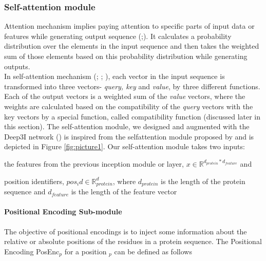 \documentclass[8pt]{article}
\begin{document}
\begin{multicols}{2}
\subsubsection{Self-attention module}
Attention mechanism implies paying attention to specific parts of input data or features while generating output sequence (\cite{bahdanau2014neural};\cite{vaswani2017attention}). It calculates a probability distribution over the elements in the input sequence and then takes the
weighted sum of those elements based on this probability distribution while generating outputs. \\

In self-attention mechanism (\cite{cheng2016long}; \cite{parikh2016decomposable}; \cite{vaswani2017attention}), each vector in the input sequence is
transformed into three vectors- \textit{query, key} and \textit{value}, by three different functions. Each of the output vectors is a weighted sum of the
\textit{value} vectors, where the weights are calculated based on the compatibility of the \textit{query} vectors with the key vectors by a special function, called compatibility function (discussed later in this section).
The self-attention module, we designed and augmented with the
Deep3I network (\cite{fang2018mufold}) is inspired from the selfattention module proposed by \cite{vaswani2017attention} and is depicted
in Figure \ref{fig:picture1}. Our self-attention module takes two inputs:

\begin{enumerate*}[label=(\roman*)]
\item {  the features from the previous inception module or layer, $ x \in  \mathbb{R}^{d_{protein} * d_{feature}} $
and}
\item { position identifiers, $ pos_i d \in \mathbb{R}^{d}_{
protein} $, where $d_{protein}$ is the
length of the protein sequence and $d_{feature}$ is the length of the feature
vector}
\end{enumerate*}
\paragraph{Positional Encoding Sub-module}


 The objective of positional encodings is to inject some information about the relative or
absolute positions of the residues in a protein sequence. The
Positional Encoding PosEnc$_p$ for a position $_p$ can be defined as follows \cite{vaswani2017attention}


\end{multicols}
\end{document}

